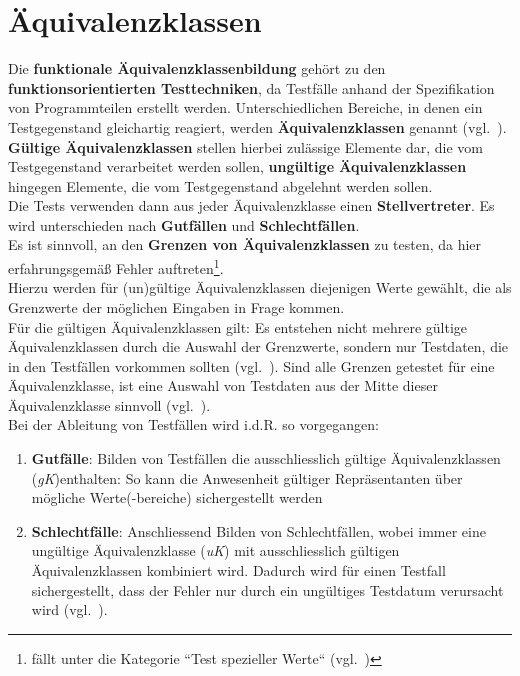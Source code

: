 \section{Äquivalenzklassen}


\begin{tcolorbox}[title=Äquivalenzklassen]
    Die \textbf{funktionale Äquivalenzklassenbildung} gehört zu den \textbf{funktionsorientierten Testtechniken}, da Testfälle anhand der Spezifikation von Programmteilen erstellt werden. Unterschiedlichen Bereiche, in denen ein Testgegenstand gleichartig reagiert, werden \textbf{Äquivalenzklassen} genannt (vgl.~\cite[43]{Wed09c}).\\

    \noindent
    \textbf{Gültige Äquivalenzklassen} stellen hierbei zulässige Elemente dar, die vom Testgegenstand verarbeitet werden sollen, \textbf{ungültige Äquivalenzklassen} hingegen Elemente, die vom Testgegenstand abgelehnt werden sollen.\\

    \noindent
    Die Tests verwenden dann aus jeder Äquivalenzklasse einen \textbf{Stellvertreter}.
    Es wird unterschieden nach \textbf{Gutfällen} und \textbf{Schlechtfällen}.\\
    Es ist sinnvoll, an den \textbf{Grenzen von Äquivalenzklassen} zu testen, da hier erfahrungsgemäß Fehler auftreten\footnote{
    fällt unter die Kategorie ``Test spezieller Werte`` (vgl.~\cite[432]{Bal97})
    }.\\
    Hierzu werden für (un)gültige Äquivalenzklassen diejenigen Werte gewählt, die als Grenzwerte der möglichen Eingaben in Frage kommen.\\
    Für die gültigen Äquivalenzklassen gilt: Es entstehen nicht mehrere gültige Äquivalenzklassen durch die Auswahl der Grenzwerte, sondern nur Testdaten, die in den Testfällen vorkommen sollten (vgl.~\cite[Tabelle 2.2, Tabelle 2.3, 56 f.]{Lig09b}).
    Sind alle Grenzen getestet für eine Äquivalenzklasse, ist eine Auswahl von Testdaten aus der Mitte dieser Äquivalenzklasse sinnvoll (vgl.~\cite[431]{Bal97}).\\

    \noindent
    Bei der Ableitung von Testfällen wird i.d.R. so vorgegangen:
    \begin{enumerate}
        \item \textbf{Gutfälle}: Bilden von Testfällen die ausschliesslich gültige Äquivalenzklassen (\textit{gK})enthalten: So kann die Anwesenheit gültiger Repräsentanten über mögliche Werte(-bereiche) sichergestellt werden
        \item \textbf{Schlechtfälle}: Anschliessend Bilden von Schlechtfällen, wobei immer eine ungültige Äquivalenzklasse (\textit{uK}) mit ausschliesslich gültigen Äquivalenzklassen kombiniert wird.
        Dadurch wird für einen Testfall sichergestellt, dass der Fehler nur durch ein ungültiges Testdatum verursacht wird (vgl.~\cite[55 f.]{Lig09b}).
    \end{enumerate}


\end{tcolorbox}
